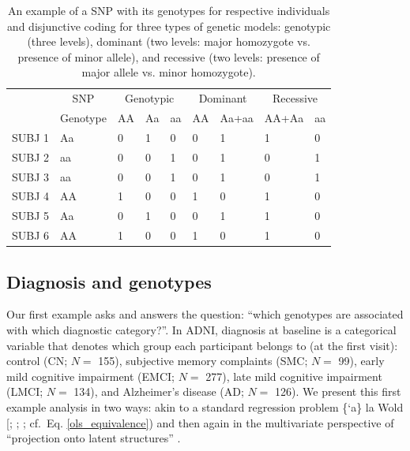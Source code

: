 \documentclass[12pt]{article}
\begin{document}
\begin{table}[!h]

\caption{\label{tab:unnamed-chunk-2}\label{table:snps_models_disj} An example of a SNP with its genotypes for respective individuals and disjunctive coding for three types of genetic models: genotypic (three levels), dominant (two levels: major homozygote vs. presence of minor allele), and recessive (two levels: presence of major allele vs. minor homozygote).}
\centering
\begin{tabular}[t]{lllllllll}
\toprule
\multicolumn{1}{c}{ } & \multicolumn{1}{c}{SNP} & \multicolumn{3}{c}{Genotypic} & \multicolumn{2}{c}{Dominant} & \multicolumn{2}{c}{Recessive} \\
\cmidrule(l{2pt}r{2pt}){2-2} \cmidrule(l{2pt}r{2pt}){3-5} \cmidrule(l{2pt}r{2pt}){6-7} \cmidrule(l{2pt}r{2pt}){8-9}
  & Genotype & AA & Aa & aa & AA & Aa+aa & AA+Aa & aa\\
\midrule
SUBJ 1 & Aa & 0 & 1 & 0 & 0 & 1 & 1 & 0\\
SUBJ 2 & aa & 0 & 0 & 1 & 0 & 1 & 0 & 1\\
SUBJ 3 & aa & 0 & 0 & 1 & 0 & 1 & 0 & 1\\
SUBJ 4 & AA & 1 & 0 & 0 & 1 & 0 & 1 & 0\\
SUBJ 5 & Aa & 0 & 1 & 0 & 0 & 1 & 1 & 0\\
\addlinespace
SUBJ 6 & AA & 1 & 0 & 0 & 1 & 0 & 1 & 0\\
\bottomrule
\end{tabular}
\end{table}

\hypertarget{diagnosis-and-genotypes}{%
\subsection{Diagnosis and genotypes}\label{diagnosis-and-genotypes}}

\label{section:plscarda}

Our first example asks and answers the question: ``which genotypes are
associated with which diagnostic category?''. In ADNI, diagnosis at
baseline is a categorical variable that denotes which group each
participant belongs to (at the first visit): control (CN; \(N=\) 155),
subjective memory complaints (SMC; \(N=\) 99), early mild cognitive
impairment (EMCI; \(N=\) 277), late mild cognitive impairment (LMCI;
\(N=\) 134), and Alzheimer's disease (AD; \(N=\) 126). We present this
first example analysis in two ways: akin to a standard regression
problem \{`a\} la Wold {[}\citet{wold1975soft};
\citet{wold_collinearity_1984}; \citet{wold_principal_1987}; cf.~Eq.
\ref{ols_equivalence}) and then again in the multivariate perspective of
``projection onto latent structures'' \citep{abdi_partial_2010-1}.
\end{document}
